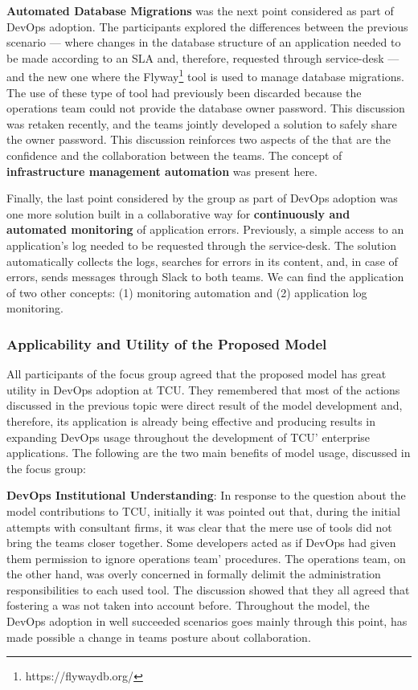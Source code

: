 \textbf{Automated Database Migrations} was the next point considered as part of
DevOps adoption. The participants explored the differences between the previous
scenario --- where changes in the database structure of an application needed to be
made according to an SLA and, therefore, requested through service-desk --- and
the new one where the Flyway\footnote{https://flywaydb.org/} tool is used to
manage database migrations. The use of these type of tool had previously been
discarded because the operations team could not provide the database owner
password. This discussion was retaken recently, and the teams jointly developed
a solution to safely share the owner password. This discussion reinforces two
aspects of the \cc that are the confidence and the collaboration between the
teams. The concept of \textbf{infrastructure management automation} was present
here.

Finally, the last point considered by the group as part of DevOps adoption was
one more solution built in a collaborative way for \textbf{continuously and automated
monitoring} of application errors. Previously, a simple access
to an application's log needed to be requested through the service-desk. The
solution automatically collects the logs, searches for errors in its content,
and,  in case of errors, sends messages through Slack to both teams. We can find
the application of two other concepts: (1) monitoring automation and
(2) application log monitoring.

\subsubsection{Applicability and Utility of the Proposed Model}

All participants of the focus group agreed that the proposed model has great
utility in DevOps adoption at TCU. They remembered that most of the actions
discussed in the previous topic were direct result of the model development and,
therefore, its application is already being effective and producing results in
expanding DevOps usage throughout the development of TCU' enterprise applications.
The following are the two main benefits of model usage, discussed in the focus
group:

\textbf{DevOps Institutional Understanding}: In response to the question about
the model contributions to TCU, initially it was pointed out that, during the
initial attempts with consultant firms, it was clear that the mere use of
tools did not bring the teams closer together. Some developers acted as if DevOps
had given them permission to ignore operations team' procedures. The
operations team, on the other hand, was overly concerned in formally delimit the administration
responsibilities to each used tool. The discussion showed that they all
agreed that fostering a \cc was not taken into account before.
Throughout the model, the DevOps adoption in well succeeded scenarios goes
mainly through this point, has made possible a change in teams posture about
collaboration.

